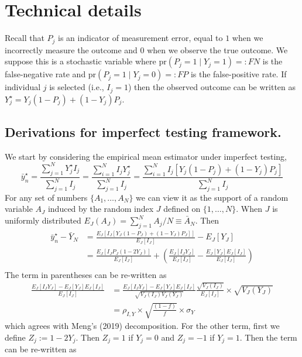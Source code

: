 \documentclass[11pt]{amsart}
\numberwithin{equation}{section}
\theoremstyle{plain}
\def\pr{\text{pr}}
\begin{document}
\section{Technical details}

Recall that $P_j$ is  an indicator of measurement error, equal to $1$ when we incorrectly measure the outcome and $0$ when we observe the true outcome. We suppose this is a stochastic variable where $\pr(P_j = 1 \mid Y_j = 1) =: FN$ is the false-negative rate and $\pr(P_j = 1 \mid Y_j = 0) =: FP$ is the false-positive rate.  If individual $j$ is selected (i.e., $I_j = 1$) then the observed outcome can be written as $Y_j^{\star} = Y_j(1-P_j) + (1-Y_j) P_j$.

\subsection{Derivations for imperfect testing framework.}
\label{app:imperfect}
We start by considering the empirical mean estimator under imperfect testing,
$$
\bar y_n^\star = \frac{\sum_{j=1}^N Y_j^\star I_j}{\sum_{j=1}^N I_j} = \frac{\sum_{i=1}^N  I_j Y_j^\star }{\sum_{j=1}^N  I_j } = \frac{\sum_{i=1}^N  I_j \left[ Y_j (1-P_j) + (1-Y_j) P_j \right]}{\sum_{j=1}^N  I_j }
$$
For any set of numbers $\{ A_1, \ldots, A_N \}$ we can view it as the support of a random variable $A_J$ induced by the random index $J$ defined on $\{1,\ldots, N\}$.  When $J$ is uniformly distributed $E_J (A_J) = \sum_{j=1}^N A_j / N \equiv \bar A_N$. Then
$$
\begin{aligned}
\bar y_n^\star  - \bar Y_N &= \frac{E_J \left[ I_J \left[ Y_J (1-P_J) + (1-Y_J) P_J \right] \right]}{E_J [ I_J ] } - E_J[Y_J] \\
&= \frac{E_J \left[ I_J P_J (1-2Y_J) \right]}{E_J [ I_J ] } + \left( \frac{E_J [I_J Y_J]}{E_J [ I_J ] } - \frac{E_J[Y_J] E_J[I_J]}{E_J[I_J]} \right) \\
\end{aligned}
$$
The term in parentheses can be re-written as
$$
\begin{aligned}
\frac{E_J [I_J Y_J]- E_J[Y_J] E_J[I_J]}{E_J[I_J]} &=  \frac{E_J [I_J Y_J]- E_J[Y_J] E_J[I_J]}{\sqrt{V_J(I_J) V_J(Y_J)}} \frac{\sqrt{V_J(I_J)}}{E_J[I_J]} \times \sqrt{V_J(Y_J)} \\
&= \rho_{I,Y} \times \sqrt{\frac{(1-f)}{f}} \times \sigma_Y
\end{aligned}
$$
which agrees with Meng's (2019) decomposition. For the other term, first we define $Z_j := 1 - 2 Y_j $. Then $Z_j = 1$ if $Y_j = 0$ and $Z_j = -1$ if $Y_j = 1$. Then the term can be re-written as
\end{document}
